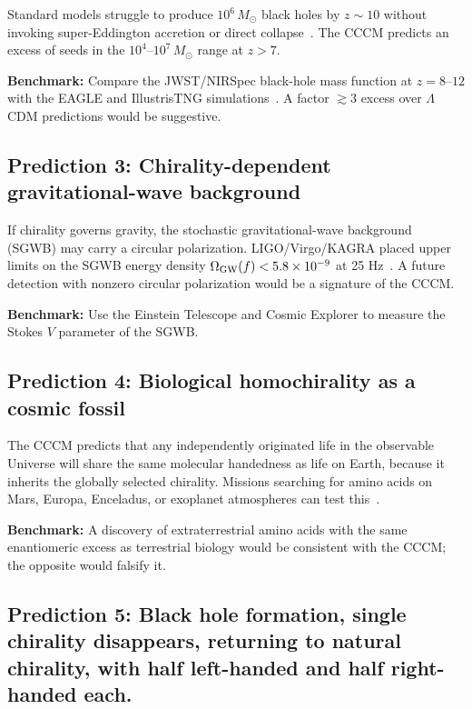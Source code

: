 \documentclass[a4paper,11pt]{article}
\newcommand{\LCDM}{$\Lambda$CDM}
\newcommand{\CCCM}{CCCM}
\begin{document}
Standard models struggle to produce $10^6\,M_\odot$ black holes by $z \sim 10$ without invoking super-Eddington accretion or direct collapse~\cite{Inayoshi2020}. The \CCCM{} predicts an excess of seeds in the $10^4$--$10^7\,M_\odot$ range at $z > 7$.

\textbf{Benchmark:} Compare the JWST/NIRSpec black-hole mass function at $z=8$--$12$ with the EAGLE and IllustrisTNG simulations~\cite{Schaye2015,Pillepich2018}. A factor $\gtrsim 3$ excess over \LCDM{} predictions would be suggestive.

\subsection{Prediction 3: Chirality-dependent gravitational-wave background}

If chirality governs gravity, the stochastic gravitational-wave background (SGWB) may carry a circular polarization. LIGO/Virgo/KAGRA placed upper limits on the SGWB energy density $\Omega_{\rm GW}(f) < 5.8\times 10^{-9}$ at 25 Hz~\cite{Abbott2023}. A future detection with nonzero circular polarization would be a signature of the \CCCM.

\textbf{Benchmark:} Use the Einstein Telescope and Cosmic Explorer to measure the Stokes $V$ parameter of the SGWB.

\subsection{Prediction 4: Biological homochirality as a cosmic fossil}


The \CCCM{} predicts that any independently originated life in the observable Universe will share the same molecular handedness as life on Earth, because it inherits the globally selected chirality. Missions searching for amino acids on Mars, Europa, Enceladus, or exoplanet atmospheres can test this~\cite{Bos2021}.


\textbf{Benchmark:} A discovery of extraterrestrial amino acids with the same enantiomeric excess as terrestrial biology would be consistent with the \CCCM; the opposite would falsify it.

\subsection{Prediction 5: Black hole formation, single chirality disappears, returning to natural chirality, with half left-handed and half right-handed each.}
\end{document}
